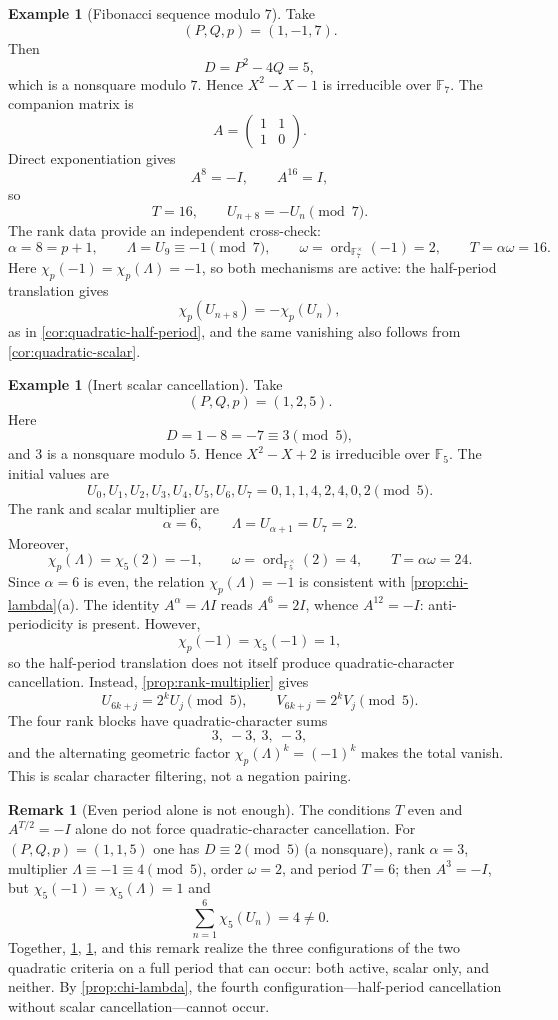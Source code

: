 \documentclass[11pt]{article}
\newcommand{\ord}{\operatorname{ord}}
\newcommand{\chiP}{\chi_p}
\theoremstyle{plain}
\theoremstyle{definition}
\newtheorem{example}[theorem]{Example}
\newtheorem{remark}[theorem]{Remark}
\begin{document}
\begin{example}[Fibonacci sequence modulo $7$]
\label{ex:fibonacci-7}
Take
\[
 (P,Q,p)=(1,-1,7).
\]
Then
\[
 D=P^2-4Q=5,
\]
which is a nonsquare modulo $7$. Hence $X^2-X-1$ is irreducible over $\mathbb{F}_7$. The companion matrix is
\[
 A=
 \begin{pmatrix}
 1&1\\
 1&0
 \end{pmatrix}.
\]
Direct exponentiation gives
\[
 A^8=-I,\qquad A^{16}=I,
\]
so
\[
 T=16,\qquad U_{n+8}=-U_n\pmod7.
\]
The rank data provide an independent cross-check:
\[
 \alpha=8=p+1,\qquad
 \Lambda=U_9\equiv-1\pmod7,\qquad
 \omega=\ord_{\mathbb{F}_7^\times}(-1)=2,\qquad
 T=\alpha\omega=16.
\]
Here $\chiP(-1)=\chiP(\Lambda)=-1$, so both mechanisms are active: the half-period translation gives
\[
 \chiP(U_{n+8})=-\chiP(U_n),
\]
as in \cref{cor:quadratic-half-period}, and the same vanishing also follows from \cref{cor:quadratic-scalar}.
\end{example}

\begin{example}[Inert scalar cancellation]
\label{ex:scalar-cancellation}
Take
\[
 (P,Q,p)=(1,2,5).
\]
Here
\[
 D=1-8=-7\equiv3\pmod5,
\]
and $3$ is a nonsquare modulo $5$. Hence $X^2-X+2$ is irreducible over $\mathbb{F}_5$. The initial values are
\[
 U_0,U_1,U_2,U_3,U_4,U_5,U_6,U_7
 =
 0,1,1,4,2,4,0,2
 \pmod5.
\]
The rank and scalar multiplier are
\[
 \alpha=6,\qquad \Lambda=U_{\alpha+1}=U_7=2.
\]
Moreover,
\[
 \chiP(\Lambda)=\chi_5(2)=-1,
 \qquad
 \omega=\ord_{\mathbb{F}_5^\times}(2)=4,
 \qquad
 T=\alpha\omega=24.
\]
Since $\alpha=6$ is even, the relation $\chiP(\Lambda)=-1$ is consistent with \cref{prop:chi-lambda}(a). The identity $A^\alpha=\Lambda I$ reads $A^6=2I$, whence $A^{12}=-I$: anti-periodicity is present. However,
\[
 \chiP(-1)=\chi_5(-1)=1,
\]
so the half-period translation does not itself produce quadratic-character cancellation. Instead, \cref{prop:rank-multiplier} gives
\[
 U_{6k+j}=2^kU_j\pmod5,
 \qquad
 V_{6k+j}=2^kV_j\pmod5.
\]
The four rank blocks have quadratic-character sums
\[
 3,\ -3,\ 3,\ -3,
\]
and the alternating geometric factor $\chiP(\Lambda)^k=(-1)^k$ makes the total vanish. This is scalar character filtering, not a negation pairing.
\end{example}

\begin{remark}[Even period alone is not enough]
\label{rem:even-period-not-enough}
The conditions $T$ even and $A^{T/2}=-I$ alone do not force quadratic-character cancellation. For $(P,Q,p)=(1,1,5)$ one has $D\equiv2\pmod5$ (a nonsquare), rank $\alpha=3$, multiplier $\Lambda\equiv-1\equiv4\pmod5$, order $\omega=2$, and period $T=6$; then $A^3=-I$, but $\chi_5(-1)=\chi_5(\Lambda)=1$ and
\[
 \sum_{n=1}^{6}\chi_5(U_n)=4\neq0.
\]
Together, \cref{ex:fibonacci-7}, \cref{ex:scalar-cancellation}, and this remark realize the three configurations of the two quadratic criteria on a full period that can occur: both active, scalar only, and neither. By \cref{prop:chi-lambda}, the fourth configuration---half-period cancellation without scalar cancellation---cannot occur.
\end{remark}
\end{document}
